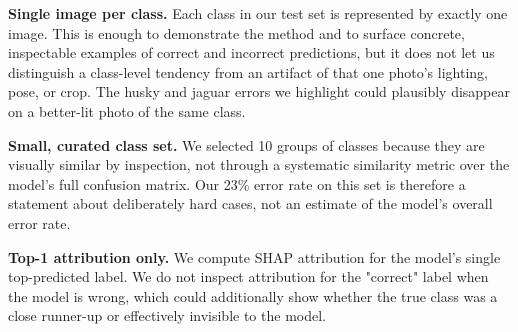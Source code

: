 \textbf{Single image per class.} Each class in our test set is represented
by exactly one image. This is enough to demonstrate the method and to
surface concrete, inspectable examples of correct and incorrect
predictions, but it does not let us distinguish a class-level tendency from
an artifact of that one photo's lighting, pose, or crop. The husky and
jaguar errors we highlight could plausibly disappear on a better-lit photo
of the same class.

\textbf{Small, curated class set.} We selected 10 groups of classes because
they are visually similar by inspection, not through a systematic
similarity metric over the model's full confusion matrix. Our 23\% error
rate on this set is therefore a statement about deliberately hard cases, not
an estimate of the model's overall error rate.

\textbf{Top-1 attribution only.} We compute SHAP attribution for the
model's single top-predicted label. We do not inspect attribution for the
"correct" label when the model is wrong, which could additionally show
whether the true class was a close runner-up or effectively invisible to
the model.
